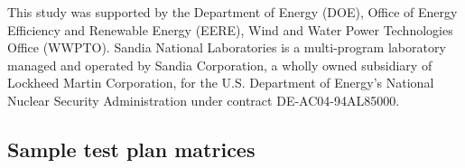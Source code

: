 \documentclass[12pt,letterpaper]{scrreprt}
\begin{document}
This study was supported by the Department of Energy (DOE), Office of Energy
Efficiency and Renewable Energy (EERE), Wind and Water Power Technologies Office
(WWPTO). Sandia National Laboratories is a multi-program laboratory managed and
operated by Sandia Corporation, a wholly owned subsidiary of Lockheed Martin
Corporation, for the U.S. Department of Energy's National Nuclear Security
Administration under contract DE-AC04-94AL85000.


\renewcommand{\bibname}{References}



\begin{appendices}

\chapter{Sample test plan matrices}


\end{appendices}
\end{document}

